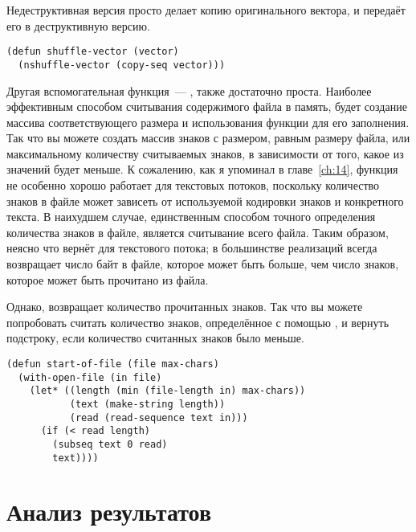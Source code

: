 Недеструктивная версия просто делает копию оригинального вектора, и передаёт его в
деструктивную версию.

\begin{lstlisting}
(defun shuffle-vector (vector)
  (nshuffle-vector (copy-seq vector)))
\end{lstlisting}

Другая вспомогательная функция~--- , также достаточно проста.
Наиболее эффективным способом считывания содержимого файла в память, будет создание
массива соответствующего размера и использования функции  для его
заполнения.  Так что вы можете создать массив знаков с размером, равным размеру файла, или
максимальному количеству считываемых знаков, в зависимости от того, какое из значений
будет меньше.  К сожалению, как я упоминал в главе~\ref{ch:14}, функция 
не особенно хорошо работает для текстовых потоков, поскольку количество знаков в файле
может зависеть от используемой кодировки знаков и конкретного текста.  В наихудшем случае,
единственным способом точного определения количества знаков в файле, является считывание
всего файла.  Таким образом, неясно что вернёт  для текстового потока; в
большинстве реализаций  всегда возвращает число байт в файле, которое
может быть больше, чем число знаков, которое может быть прочитано из файла.

Однако,  возвращает количество прочитанных знаков.  Так что вы можете
попробовать считать количество знаков, определённое с помощью , и вернуть
подстроку, если количество считанных знаков было меньше.

\begin{lstlisting}
(defun start-of-file (file max-chars)
  (with-open-file (in file)
    (let* ((length (min (file-length in) max-chars))
           (text (make-string length))
           (read (read-sequence text in)))
      (if (< read length)
        (subseq text 0 read)
        text))))
\end{lstlisting}


\section{Анализ результатов}

